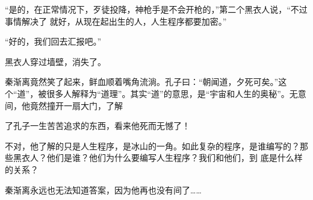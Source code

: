 \documentclass{article}
\begin{document}
“是的，在正常情况下，歹徒投降，神枪手是不会开枪的，”第二个黑衣人说，“不过事情解决了
就好，从现在起出生的人，人生程序都要加密。” 


“好的，我们回去汇报吧。” 


黑衣人穿过墙壁，消失了。 

秦渐离竟然笑了起来，鲜血顺着嘴角流淌。孔子曰：“朝闻道，夕死可矣。”这个“道”，被很多人解释为“道理”。其实“道”的意思，是“宇宙和人生的奥秘”。无意间，他竟然撞开一扇大门，了解
\newpage

了孔子一生苦苦追求的东西，看来他死而无憾了！ 

不对，他了解的只是人生程序，是冰山的一角。如此复杂的程序，是谁编写的？那些黑衣人？他们是谁？他们为什么要编写人生程序？我们和他们，到
底是什么样的关系？ 

秦渐离永远也无法知道答案，因为他再也没有间了……
\end{document}
